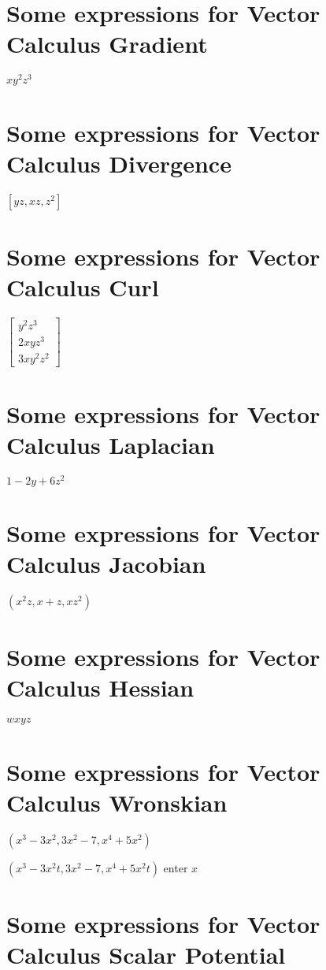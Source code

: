 \documentclass{article}
\begin{document}
\section{Some expressions for Vector Calculus Gradient}

$xy^{2}z^{3}$

\section{Some expressions for Vector Calculus Divergence}

$\left[ yz,xz,z^{2}\right] $

\section{Some expressions for Vector Calculus Curl}

$\left[ 
\begin{array}{c}
y^{2}z^{3} \\ 
2xyz^{3} \\ 
3xy^{2}z^{2}%
\end{array}%
\right] $

\section{Some expressions for Vector Calculus Laplacian}

$1-2y+6z^{2}$

\section{Some expressions for Vector Calculus Jacobian}

$(x^{2}z,x+z,xz^{2})$

\section{Some expressions for Vector Calculus Hessian}

$wxyz$

\section{Some expressions for Vector Calculus Wronskian}

$\left( x^{3}-3x^{2},3x^{2}-7,x^{4}+5x^{2}\right) $

$\left( x^{3}-3x^{2}t,3x^{2}-7,x^{4}+5x^{2}t\right) $ enter $x$

\section{Some expressions for Vector Calculus Scalar Potential}
\end{document}
